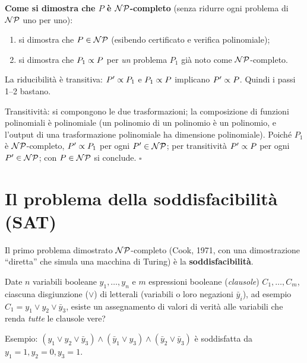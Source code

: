 \textbf{Come si dimostra che $P$ è $\mathcal{NP}$-completo} (senza ridurre ogni problema di $\mathcal{NP}$ uno per uno):
\begin{enumerate}[nosep]
\item si dimostra che $P\in\mathcal{NP}$ (esibendo certificato e verifica polinomiale);
\item si dimostra che $P_1\propto P$ per \emph{un} problema $P_1$ già noto come $\mathcal{NP}$-completo.
\end{enumerate}
\begin{prop}
La riducibilità è transitiva: $P'\propto P_1$ e $P_1\propto P$ implicano $P'\propto P$. Quindi i passi 1--2 bastano.
\end{prop}
\begin{dimo}
Transitività: si compongono le due trasformazioni; la composizione di funzioni polinomiali è polinomiale (un polinomio di un polinomio è un polinomio, e l'output di una trasformazione polinomiale ha dimensione polinomiale). Poiché $P_1$ è $\mathcal{NP}$-completo, $P'\propto P_1$ per ogni $P'\in\mathcal{NP}$; per transitività $P'\propto P$ per ogni $P'\in\mathcal{NP}$; con $P\in\mathcal{NP}$ si conclude. \hfill$\square$
\end{dimo}

\begin{center}
\end{center}

\section{Il problema della soddisfacibilità (SAT)}

Il primo problema dimostrato $\mathcal{NP}$-completo (Cook, 1971, con una dimostrazione ``diretta'' che simula una macchina di Turing) è la \textbf{soddisfacibilità}.
\begin{defbox}[SAT]
Date $n$ variabili booleane $y_1,\dots,y_n$ e $m$ espressioni booleane (\emph{clausole}) $C_1,\dots,C_m$, ciascuna disgiunzione ($\lor$) di letterali (variabili o loro negazioni $\bar y_i$), ad esempio $C_1=y_1\lor y_2\lor\bar y_3$, esiste un assegnamento di valori di verità alle variabili che renda \emph{tutte} le clausole vere?
\end{defbox}
Esempio: $(y_1\lor y_2\lor\bar y_3)\land(\bar y_1\lor y_3)\land(\bar y_2\lor\bar y_3)$ è soddisfatta da $y_1=1,y_2=0,y_3=1$.

